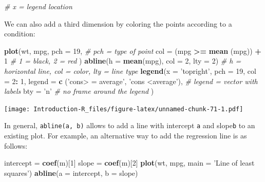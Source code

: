 \documentclass[]{book}
\newenvironment{Shaded}{\begin{snugshade}}{\end{snugshade}}
\newcommand{\CommentTok}[1]{\textcolor[rgb]{0.56,0.35,0.01}{\textit{#1}}}
\newcommand{\DataTypeTok}[1]{\textcolor[rgb]{0.13,0.29,0.53}{#1}}
\newcommand{\DecValTok}[1]{\textcolor[rgb]{0.00,0.00,0.81}{#1}}
\newcommand{\KeywordTok}[1]{\textcolor[rgb]{0.13,0.29,0.53}{\textbf{#1}}}
\newcommand{\NormalTok}[1]{#1}
\newcommand{\OperatorTok}[1]{\textcolor[rgb]{0.81,0.36,0.00}{\textbf{#1}}}
\newcommand{\StringTok}[1]{\textcolor[rgb]{0.31,0.60,0.02}{#1}}
\begin{document}
\begin{Shaded}
\begin{Highlighting}[]
\CommentTok{# x = legend location}
\end{Highlighting}
\end{Shaded}

We can also add a third dimension by coloring the points according to a condition:

\begin{Shaded}
\begin{Highlighting}[]
\KeywordTok{plot}\NormalTok{(wt, mpg,}
     \DataTypeTok{pch =} \DecValTok{19}\NormalTok{, }\CommentTok{# pch = type of point}
     \DataTypeTok{col =}\NormalTok{ (mpg }\OperatorTok{>=}\StringTok{ }\KeywordTok{mean}\NormalTok{ (mpg)) }\OperatorTok{+}\StringTok{ }\DecValTok{1} \CommentTok{# 1 = black, 2 = red}
\NormalTok{)}
\KeywordTok{abline}\NormalTok{(}\DataTypeTok{h =} \KeywordTok{mean}\NormalTok{(mpg), }\DataTypeTok{col =} \DecValTok{2}\NormalTok{, }\DataTypeTok{lty =} \DecValTok{2}\NormalTok{) }\CommentTok{# h = horizontal line, col = color, lty = line type}
\KeywordTok{legend}\NormalTok{(}\DataTypeTok{x =} \StringTok{'topright'}\NormalTok{,}
       \DataTypeTok{pch =} \DecValTok{19}\NormalTok{,}
       \DataTypeTok{col =} \DecValTok{2}\OperatorTok{:}\StringTok{ }\DecValTok{1}\NormalTok{,}
       \DataTypeTok{legend =} \KeywordTok{c}\NormalTok{ (}\StringTok{'cons> = average'}\NormalTok{, }\StringTok{'cons <average'}\NormalTok{), }\CommentTok{# legend = vector with labels}
       \DataTypeTok{bty =} \StringTok{'n'} \CommentTok{# no frame around the legend}
\NormalTok{)}
\end{Highlighting}
\end{Shaded}

\texttt{[image: Introduction-R\_files/figure-latex/unnamed-chunk-71-1.pdf]}

In general, \texttt{abline(a,\ b)} allows to add a line with intercept \texttt{a} and slope\texttt{b} to an existing plot. For example, an alternative way to add the regression line is as follows:

\begin{Shaded}
\begin{Highlighting}[]
\NormalTok{intercept =}\StringTok{ }\KeywordTok{coef}\NormalTok{(m)[}\DecValTok{1}\NormalTok{]}
\NormalTok{slope =}\StringTok{ }\KeywordTok{coef}\NormalTok{(m)[}\DecValTok{2}\NormalTok{]}
\KeywordTok{plot}\NormalTok{(wt, mpg, }\DataTypeTok{main =} \StringTok{'Line of least squares'}\NormalTok{)}
\KeywordTok{abline}\NormalTok{(}\DataTypeTok{a =}\NormalTok{ intercept, }\DataTypeTok{b =}\NormalTok{ slope)}
\end{Highlighting}
\end{Shaded}
\end{document}
